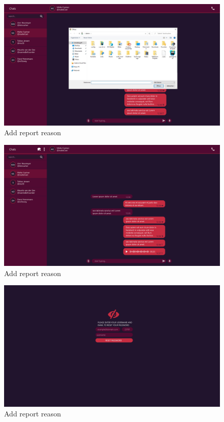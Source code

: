 \begin{figure}[h]
    \centering
    \includegraphics[width=1.0\textwidth]{./graphics/wireframes/ChooseFileToSend}
    \caption{Add report reason}
    \label{fig:figure15}
\end{figure}

\begin{figure}[h]
    \centering
    \includegraphics[width=1.0\textwidth]{./graphics/wireframes/DisplayVoiceMessage}
    \caption{Add report reason}
    \label{fig:figure16}
\end{figure}

\begin{figure}[h]
    \centering
    \includegraphics[width=1.0\textwidth]{./graphics/wireframes/ForgotPassword}
    \caption{Add report reason}
    \label{fig:figure17}
\end{figure}

